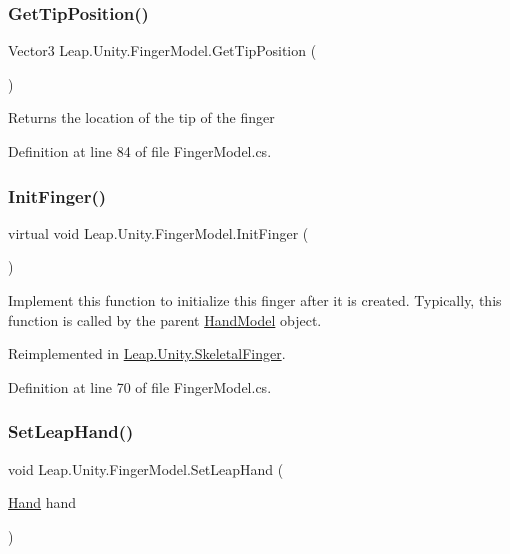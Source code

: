 \subsubsection{\texorpdfstring{GetTipPosition()}{GetTipPosition()}}
{\footnotesize\ttfamily Vector3 Leap.\+Unity.\+Finger\+Model.\+Get\+Tip\+Position (\begin{DoxyParamCaption}{ }\end{DoxyParamCaption})}

Returns the location of the tip of the finger 

Definition at line 84 of file Finger\+Model.\+cs.

\mbox{\label{class_leap_1_1_unity_1_1_finger_model_a27b24f96e9e709625779cc24bd5d72f3}} 
\subsubsection{\texorpdfstring{InitFinger()}{InitFinger()}}
{\footnotesize\ttfamily virtual void Leap.\+Unity.\+Finger\+Model.\+Init\+Finger (\begin{DoxyParamCaption}{ }\end{DoxyParamCaption})\hspace{0.3cm}{\ttfamily [virtual]}}

Implement this function to initialize this finger after it is created. Typically, this function is called by the parent \mbox{\hyperlink{class_leap_1_1_unity_1_1_hand_model}{Hand\+Model}} object. 

Reimplemented in \mbox{\hyperlink{class_leap_1_1_unity_1_1_skeletal_finger_a1d595125b2ac26548297c23e4937ca03}{Leap.\+Unity.\+Skeletal\+Finger}}.



Definition at line 70 of file Finger\+Model.\+cs.

\mbox{\label{class_leap_1_1_unity_1_1_finger_model_a5f8a0bc34c12092d53249cbdb2e19b75}} 
\subsubsection{\texorpdfstring{SetLeapHand()}{SetLeapHand()}}
{\footnotesize\ttfamily void Leap.\+Unity.\+Finger\+Model.\+Set\+Leap\+Hand (\begin{DoxyParamCaption}\item[{\mbox{\hyperlink{class_leap_1_1_hand}{Hand}}}]{hand }\end{DoxyParamCaption})}


